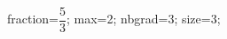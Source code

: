 \documentclass[exercice]{thedocument}%
\begin{document}
%
\>fraction=$\dfrac{5}{3}$;%
\>max=2;%
\>nbgrad=3;%
\>size=3;%
%
\end{document}
